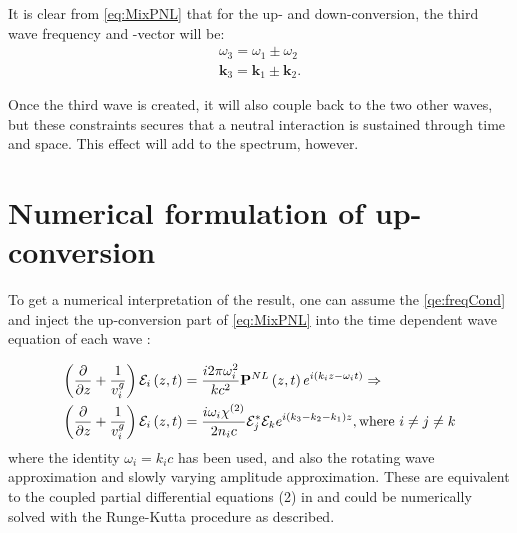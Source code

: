 It is clear from \cref{eq:MixPNL} that for the up- and down-conversion, the third wave frequency and -vector will be:
\begin{align}
  \label{qe:freqCond}
  \omega_3 = \omega_1 \pm \omega_2 \\
  \mathbf{k}_3 = \mathbf{k}_1 \pm \mathbf{k}_2.
\end{align}

Once the third wave is created, it will also couple back to
the two other waves, but these constraints secures that a neutral interaction is sustained through time and space.
This effect will add to the spectrum, however.




\section{Numerical formulation of up-conversion}
\label{sec:mixing-numeric}
 
To get a numerical interpretation of the result, one can assume the
\cref{qe:freqCond} and inject the up-conversion part of \cref{eq:MixPNL} into the time dependent wave equation of each wave \cite[Equation 3.39]{shen}:

\begin{align*}
\paren{ \pdiff{}{z}  + \frac{1}{v_i^{g}} } \mathcal{E}_i \paren{z, t}
&= \frac{i 2 \pi \omega_i^{2}}{k c^2} \mathbf{P}^{NL} \paren{z,t} e^{i \paren{k_i z - \omega_{i}
    t}} \Rightarrow \\%
\paren{ \pdiff{}{z}  + \frac{1}{v_i^{g}} } \mathcal{E}_i \paren{z, t}
&= \frac{i \omega_i \chi^{(2)}}{2 n_i c} \mathcal{E}_j^{*}\mathcal{E}_k e^{i (k_3 - k_2 -k_1) z}, \text{where } i \neq j \neq k \\
\end{align*}
where the identity $\omega_i = k_ic$ has been used, and also the rotating wave
approximation and slowly varying amplitude approximation. These are equivalent to
the coupled partial differential
equations  (2) in \cite{bakker} and could be numerically solved with the Runge-Kutta procedure
as described.

